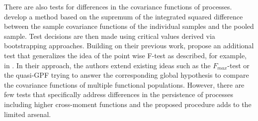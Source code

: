 \documentclass[12pt, a4paper]{article}
\theoremstyle{MAstyle} \newtheorem{assumption}{Assumption}[section]
\theoremstyle{MAstyle} \newtheorem{definition}{Definition}[section]
\theoremstyle{MAstyle} \newtheorem{theorem}{Theorem}[section]
\begin{document}
		
		There are also tests for differences in the covariance functions of processes. 
		\cite{guo_testing_2018} develop a method based on the supremum of the integrated squared difference between the sample covariance functions of the individual samples and the pooled sample. Test decisions are then made using critical values derived via bootstrapping approaches.		Building on their previous work, \cite{guo_new_2019} propose an additional test that generalizes the idea of the point wise F-test as described, for example, in \cite{ramsay_functional_2005}. In their approach, the authors extend existing ideas such as the $F_{\textit{max}}$-test or the quasi-GPF trying to answer the corresponding global hypothesis to compare the covariance functions of multiple functional populations.
		However, there are few tests that specifically address differences in the persistence of processes including higher cross-moment functions and the proposed procedure adds to the limited arsenal.
		
\end{document}
